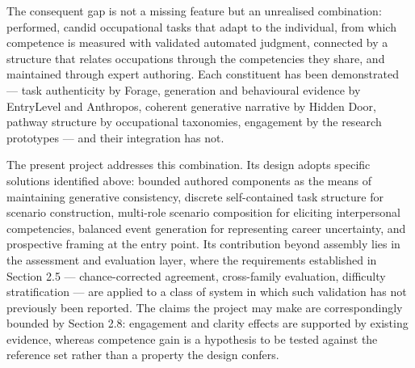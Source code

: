 The consequent gap is not a missing feature but an unrealised combination: performed, candid occupational tasks that adapt to the individual, from which competence is measured with validated automated judgment, connected by a structure that relates occupations through the competencies they share, and maintained through expert authoring. Each constituent has been demonstrated --- task authenticity by Forage, generation and behavioural evidence by EntryLevel and Anthropos, coherent generative narrative by Hidden Door, pathway structure by occupational taxonomies, engagement by the research prototypes --- and their integration has not.

The present project addresses this combination. Its design adopts specific solutions identified above: bounded authored components as the means of maintaining generative consistency, discrete self-\allowbreak{}contained task structure for scenario construction, multi-role scenario composition for eliciting interpersonal competencies, balanced event generation for representing career uncertainty, and prospective framing at the entry point. Its contribution beyond assembly lies in the assessment and evaluation layer, where the requirements established in Section 2.5 --- chance-\allowbreak{}corrected agreement, cross-\allowbreak{}family evaluation, difficulty stratification --- are applied to a class of system in which such validation has not previously been reported. The claims the project may make are correspondingly bounded by Section 2.8: engagement and clarity effects are supported by existing evidence, whereas competence gain is a hypothesis to be tested against the reference set rather than a property the design confers.
